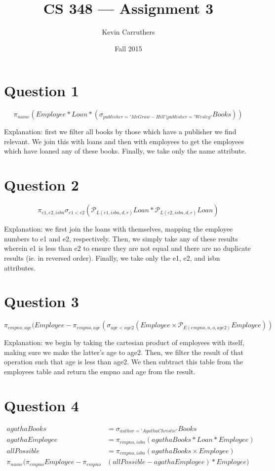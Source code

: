 \documentclass[12pt]{article}
\begin{document}
\title{CS 348 --- Assignment 3}
\author{Kevin Carruthers}
\date{\vspace{-2ex}Fall 2015}
\maketitle\HRule

\section{Question 1}
\[ \pi_{name}(Employee * Loan * (\sigma_{publisher='McGraw-Hill' | publisher='Wesley'} Books)) \]

Explanation: first we filter all books by those which have a publisher we find relevant. We join this with loans and then with employees to get the employees which have loaned any of these books. Finally, we take only the name attribute.

\section{Question 2}
\[ \pi_{e1, e2, isbn} \sigma_{e1 < e2} (\mathcal{P}_{L(e1, isbn, d, r)} Loan * \mathcal{P}_{L(e2, isbn, d, r)} Loan) \]

Explanation: we first join the loans with themselves, mapping the employee numbers to e1 and e2, respectively. Then, we simply take any of these results wherein e1 is less than e2 to ensure they are not equal and there are no duplicate results (ie. in reversed order). Finally, we take only the e1, e2, and isbn attributes.

\section{Question 3}
\[ \pi_{empno, age} (Employee - \pi_{empno, age} (\sigma_{age < age2} (Employee \times \mathcal{P}_{E(empno, n, o, age2)} Employee)) \]

Explanation: we begin by taking the cartesian product of employees with itself, making sure we make the latter's age to age2. Then, we filter the result of that operation such that age is less than age2. We then subtract this table from the employees table and return the empno and age from the result.

\section{Question 4}
\begin{align*}
agathaBooks &= \sigma_{author='Agatha Christie'} Books \\
agathaEmployee &= \pi_{empno,isbn} (agathaBooks * Loan * Employee) \\
allPossible &= \pi_{empno,isbn} (agathaBooks \times Employee) \\
\pi_{name} (\pi_{empno} Employee - \pi_{empno} &(allPossible - agathaEmployee) * Employee)
\end{align*}
\end{document}
